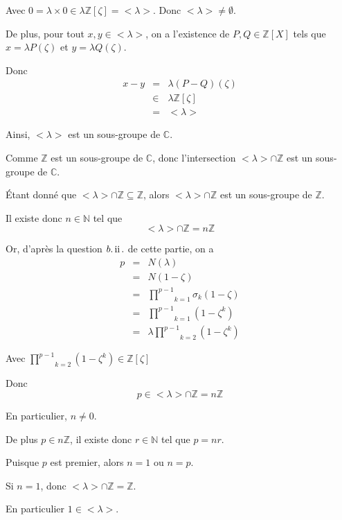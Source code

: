 Avec $0 = \lambda \times 0 \in \lambda \mathbb{Z} [\zeta] = < \lambda >$. Donc
$< \lambda > \neq \emptyset$.

De plus, pour tout $x, y \in < \lambda >$, on a l'existence de $P, Q \in
\mathbb{Z} [X]$ tels que $x = \lambda P (\zeta)$ et $y = \lambda Q (\zeta)$.

Donc
\begin{eqnarray*}
  x - y & = & \lambda (P - Q) (\zeta)\\
  & \in & \lambda \mathbb{Z} [\zeta]\\
  & = & < \lambda >
\end{eqnarray*}


Ainsi, $< \lambda >$ est un sous-groupe de $\mathbb{C}$.

Comme $\mathbb{Z}$ est un sous-groupe de $\mathbb{C}$, donc l'intersection $<
\lambda > \cap \mathbb{Z}$ est un sous-groupe de $\mathbb{C}$.

{\'E}tant donn{\'e} que $< \lambda > \cap \mathbb{Z} \subseteq \mathbb{Z}$,
alors $< \lambda > \cap \mathbb{Z}$ est un sous-groupe de $\mathbb{Z}$.

Il existe donc $n \in \mathbb{N}$ tel que
\[ < \lambda > \cap \mathbb{Z}= n\mathbb{Z} \]


Or, d'apr{\`e}s la question $b. \operatorname{ii} .$ de cette partie, on a
\begin{eqnarray*}
  p & = & N (\lambda)\\
  & = & N (1 - \zeta)\\
  & = & \underset{k = 1}{\overset{p - 1}{\prod}} \sigma_k (1 - \zeta)\\
  & = & \underset{k = 1}{\overset{p - 1}{\prod}} (1 - \zeta^k)\\
  & = & \lambda \underset{k = 2}{\overset{p - 1}{\prod}} (1 - \zeta^k)
\end{eqnarray*}


Avec $\underset{k = 2}{\overset{p - 1}{\prod}} (1 - \zeta^k) \in \mathbb{Z}
[\zeta]$

Donc
\[ p \in < \lambda > \cap \mathbb{Z}= n\mathbb{Z} \]


En particulier, $n \neq 0$.

De plus $p \in n\mathbb{Z}$, il existe donc $r \in \mathbb{N}$ tel que $p = n
r$.

Puisque $p$ est premier, alors $n = 1$ ou $n = p$.

Si $n = 1$, donc $< \lambda > \cap \mathbb{Z}=\mathbb{Z}$.

En particulier $1 \in < \lambda >$.

